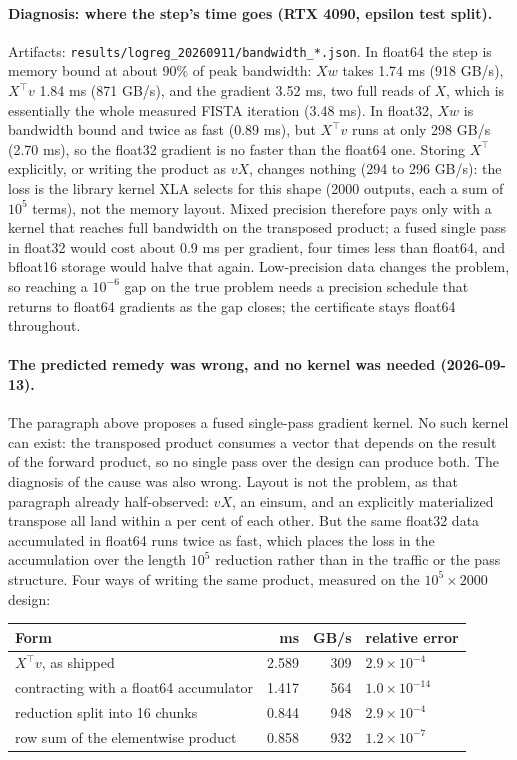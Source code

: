 \paragraph{Diagnosis: where the step's time goes (RTX 4090, epsilon test split).}
Artifacts: \texttt{results/logreg\_20260911/bandwidth\_*.json}. In float64 the
step is memory bound at about 90\% of peak bandwidth: $Xw$ takes 1.74 ms (918
GB/s), $X^\top v$ 1.84 ms (871 GB/s), and the gradient 3.52 ms, two full reads
of $X$, which is essentially the whole measured FISTA iteration (3.48 ms). In
float32, $Xw$ is bandwidth bound and twice as fast (0.89 ms), but $X^\top v$
runs at only 298 GB/s (2.70 ms), so the float32 gradient is no faster than
the float64 one. Storing $X^\top$ explicitly, or writing the product as $vX$,
changes nothing (294 to 296 GB/s): the loss is the library kernel XLA selects
for this shape (2000 outputs, each a sum of $10^5$ terms), not the memory
layout. Mixed precision therefore pays only with a kernel that reaches full
bandwidth on the transposed product; a fused single pass in float32 would
cost about 0.9 ms per gradient, four times less than float64, and bfloat16
storage would halve that again. Low-precision data changes the problem, so
reaching a $10^{-6}$ gap on the true problem needs a precision schedule that
returns to float64 gradients as the gap closes; the certificate stays float64
throughout.

\paragraph{The predicted remedy was wrong, and no kernel was needed (2026-09-13).}
The paragraph above proposes a fused single-pass gradient kernel. No such kernel
can exist: the transposed product consumes a vector that depends on the result
of the forward product, so no single pass over the design can produce both. The
diagnosis of the cause was also wrong. Layout is not the problem, as that
paragraph already half-observed: $vX$, an einsum, and an explicitly materialized
transpose all land within a per cent of each other. But the same float32 data
accumulated in float64 runs twice as fast, which places the loss in the
accumulation over the length $10^5$ reduction rather than in the traffic or the
pass structure. Four ways of writing the same product, measured on the $10^5
\times 2000$ design:

\begin{center}
\small
\begin{tabular}{lrrl}
\toprule
Form & ms & GB/s & relative error \\
\midrule
$X^\top v$, as shipped & 2.589 & 309 & $2.9\times10^{-4}$ \\
contracting with a float64 accumulator & 1.417 & 564 & $1.0\times10^{-14}$ \\
reduction split into 16 chunks & 0.844 & 948 & $2.9\times10^{-4}$ \\
row sum of the elementwise product & 0.858 & 932 & $1.2\times10^{-7}$ \\
\bottomrule
\end{tabular}
\end{center}

